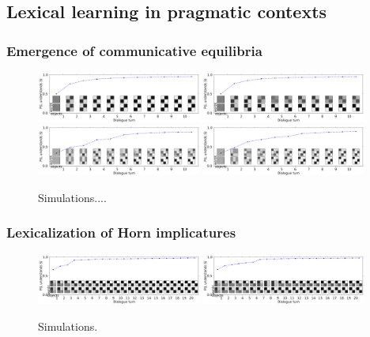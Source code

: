 \documentclass{article} %
\begin{document}
\subsection{Lexical learning in pragmatic contexts}

\subsubsection{Emergence of communicative equilibria}

\begin{figure}
\centering
\includegraphics[width=0.48\textwidth]{figures/emergence2x2-1.pdf}
\includegraphics[width=0.48\textwidth]{figures/emergence2x2-3.pdf} \\
\includegraphics[width=0.48\textwidth]{figures/emergence3x3-0.pdf}
\includegraphics[width=0.48\textwidth]{figures/emergence3x3-1.pdf} \\
\caption{\label{fig:emergence} Simulations....}
\end{figure}


\subsubsection{Lexicalization of Horn implicatures}

\begin{figure}
\centering
\includegraphics[width=0.48\textwidth]{figures/horn-emergence-0.pdf}
\includegraphics[width=0.48\textwidth]{figures/horn-emergence-1.pdf}
\caption{\label{fig:horn} Simulations.}
\end{figure}
\end{document}
